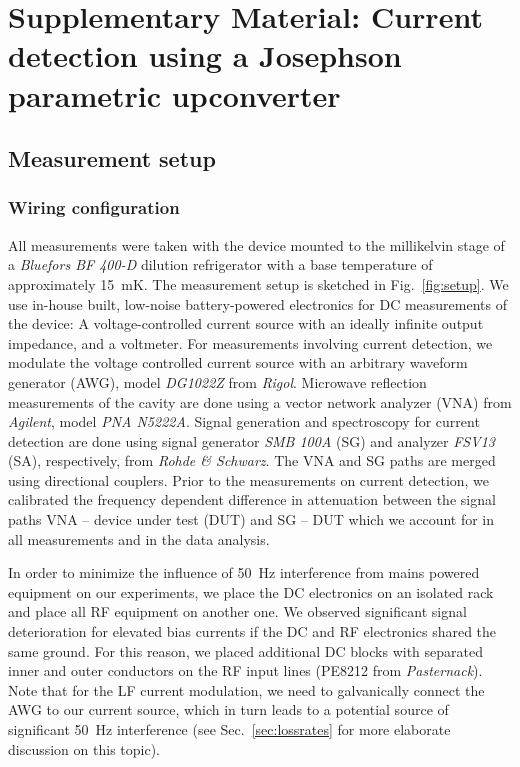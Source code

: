 
\section{Supplementary Material: Current detection using a Josephson parametric upconverter}


\subsection{Measurement setup}\label{sec:measurement}

\subsubsection{Wiring configuration}

All measurements were taken with the device mounted to the millikelvin stage of a \textit{Bluefors BF 400-D} dilution refrigerator with a base temperature of approximately \SI{15}{\milli\kelvin}.
% 
The measurement setup is sketched in Fig.~\ref{fig:setup}.
% 
We use in-house built, low-noise battery-powered electronics for DC measurements of the device: A voltage-controlled current source with an ideally infinite output impedance, and a voltmeter.
% 
For measurements involving current detection, we modulate the voltage controlled current source with an arbitrary waveform generator (AWG), model \textit{DG1022Z} from \textit{Rigol}.
% 
Microwave reflection measurements of the cavity are done using a vector network analyzer (VNA) from \textit{Agilent}, model \textit{PNA N5222A}.
% 
Signal generation and spectroscopy for current detection are done using signal generator \textit{SMB 100A} (SG) and analyzer \textit{FSV13} (SA), respectively, from \textit{Rohde \& Schwarz}.
% 
The VNA and SG paths are merged using directional couplers.
% 
Prior to the measurements on current detection, we calibrated the frequency dependent difference in attenuation between the signal paths VNA -- device under test (DUT) and SG -- DUT which we account for in all measurements and in the data analysis.

In order to minimize the influence of \SI{50}{\hertz} interference from mains powered equipment on our experiments, we place the DC electronics on an isolated rack and place all RF equipment on another one.
% 
We observed significant signal deterioration for elevated bias currents if the DC and RF electronics shared the same ground.
% 
For this reason, we placed additional DC blocks with separated inner and outer conductors on the RF input lines (PE8212 from \textit{Pasternack}).
% 
Note that for the LF current modulation, we need to galvanically connect the AWG to our current source, which in turn leads to a potential source of significant \SI{50}{\hertz} interference (see Sec.~\ref{sec:lossrates} for more elaborate discussion on this topic).

